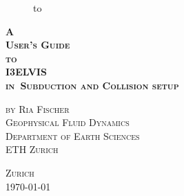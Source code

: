 %

\begin{titlepage}
\begin{figure}[b!]
  \begin{center}
    \hbox to 
  \end{center}
\end{figure}
\begin{center}
\rule{0pt}{0pt}


\begin{Large}
\vspace*{3.75cm}
\begin{huge}
\textbf{\textsc{
A\\
User's Guide\\
to\\
I3ELVIS\\
in\
Subduction and Collision setup}}\\[0.75ex]
\end{huge}
\vspace*{2.75cm}

\textsc{by Ria Fischer}\\[0.75ex]
\textsc{Geophysical Fluid Dynamics}\\[0.75ex]
\textsc{Department of Earth Sciences}\\[0.75ex]
\textsc{ETH Zurich}\\[0.75ex]
\vspace*{5.75cm}
\end{Large}

\textsc{Zurich}\\
\textsc{\monthyeardate\today}\\
\vspace*{0.75cm}

\end{center}
\end{titlepage}